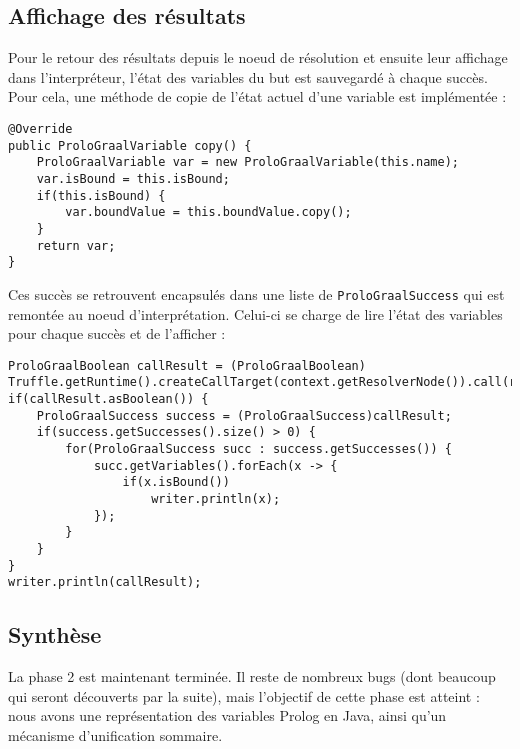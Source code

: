 \documentclass[../report.tex]{subfiles}
\begin{document}
\subsection{Affichage des résultats}
Pour le retour des résultats depuis le noeud de résolution et ensuite leur affichage dans l'interpréteur, l'état des variables du but est sauvegardé à chaque succès. Pour cela, une méthode de copie de l'état actuel d'une variable est implémentée :
\begin{verbatim}
@Override
public ProloGraalVariable copy() {
    ProloGraalVariable var = new ProloGraalVariable(this.name);
    var.isBound = this.isBound;
    if(this.isBound) {
        var.boundValue = this.boundValue.copy();
    }
    return var;
}
\end{verbatim}
Ces succès se retrouvent encapsulés dans une liste de \texttt{ProloGraalSuccess} qui est remontée au noeud d'interprétation. Celui-ci se charge de lire l'état des variables pour chaque succès et de l'afficher :
\begin{verbatim}
ProloGraalBoolean callResult = (ProloGraalBoolean) Truffle.getRuntime().createCallTarget(context.getResolverNode()).call(runtime);
if(callResult.asBoolean()) {
    ProloGraalSuccess success = (ProloGraalSuccess)callResult;
    if(success.getSuccesses().size() > 0) {
        for(ProloGraalSuccess succ : success.getSuccesses()) {
            succ.getVariables().forEach(x -> {
                if(x.isBound())
                    writer.println(x);
            });
        }
    }
}
writer.println(callResult);
\end{verbatim}
\subsection{Synthèse}
La phase 2 est maintenant terminée. Il reste de nombreux bugs (dont beaucoup qui seront découverts par la suite), mais l'objectif de cette phase est atteint : nous avons une représentation des variables Prolog en Java, ainsi qu'un mécanisme d'unification sommaire.
\end{document}
